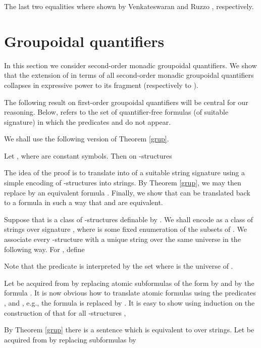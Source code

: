 \documentclass{LMCS}
\begin{document}
The last two equalities where shown by Venkateswaran  \cite{ven91} and  Ruzzo \cite{ruz80}, respectively.


\section{Groupoidal quantifiers}

\noindent In this section we consider second-order monadic groupoidal
quantifiers. We show that the extension of  in terms of all
second-order monadic groupoidal quantifiers collapses in expressive
power to its fragment  (respectively to
).

The following result on first-order groupoidal quantifiers will be central for our reasoning.
Below,  refers to the set of quantifier-free formulas (of suitable signature) in which the predicates  and  do not appear.

\begin{thm}\label{grup}  
\end{thm}
We shall use the following  version  of Theorem \ref{grup}.

\begin{lem}\label{new}Let , where  are  constant symbols. Then on -structures

\end{lem}
\proof The idea of the proof is to translate  into  of a suitable string signature using a simple encoding of -structures into strings. By Theorem \ref{grup}, we may then replace  by an equivalent formula . Finally, we show that  can be translated back to a formula
 in such  a way that   and  are equivalent.
 
Suppose that  is a class of -structures definable by .
We shall encode  as a class of strings over signature
, where  is some fixed enumeration of
the subsets of . We associate every -structure  with a unique string
 over the same universe in the following way. For ,  define

Note that the predicate  is interpreted by the set  where  is the universe of .

 Let  be acquired from  by replacing atomic subformulas
of the form  by  and  by the formula .
It is now obvious how to translate atomic formulas using the predicates , and , e.g., the formula  is replaced by . It is easy to show using induction on the construction of  that for all -structures
 , 

By Theorem \ref{grup} there is a sentence  which is equivalent to 
over strings. Let  be acquired from  by replacing subformulas    by
\end{document}
